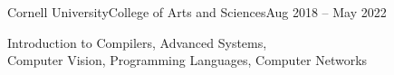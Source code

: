 \documentclass{resume}
\begin{document}
\begin{education}
\begin{entryleft}{Cornell University}{College of Arts and Sciences}{Aug 2018 -- May 2022}
\begin{description}
\begin{spacing}{0.2}
                Introduction to Compilers, Advanced Systems, \\
                Computer Vision,
                Programming Languages, %
                Computer Networks
                \end{spacing}
        \end{description}
    \end{entryleft}
\end{education}
\end{document}
